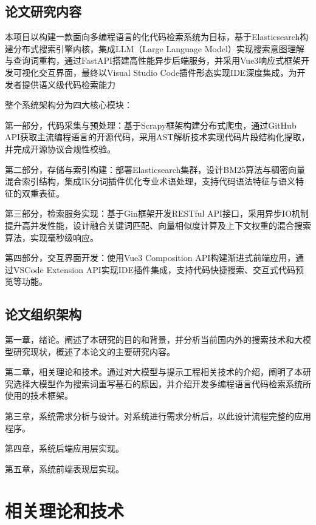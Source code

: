 \documentclass[UTF8,a4paper,12pt]{ctexart}
\numberwithin{equation}{section}
\begin{document}
\subsection{论文研究内容}
本项目以构建一款面向多编程语言的化代码检索系统为目标，基于Elasticsearch构建分布式搜索引擎内核，集成LLM（Large Language Model）实现搜索意图理解与查询词重构，通过FastAPI搭建高性能异步后端服务，并采用Vue3响应式框架开发可视化交互界面，最终以Visual Studio Code插件形态实现IDE深度集成，为开发者提供语义级代码检索能力\par
整个系统架构分为四大核心模块：\par
第一部分，​代码采集与预处理：基于Scrapy框架构建分布式爬虫，通过GitHub API获取主流编程语言的开源代码，采用AST解析技术实现代码片段结构化提取，并完成开源协议合规性校验。\par
第二部分，​存储与索引构建：部署Elasticsearch集群，设计BM25算法与稠密向量混合索引结构，集成IK分词插件优化专业术语处理，支持代码语法特征与语义特征的双重表征。\par
第三部分，​检索服务实现：基于Gin框架开发RESTful API接口，采用异步IO机制提升高并发性能，设计融合关键词匹配、向量相似度计算及上下文权重的混合搜索算法，实现毫秒级响应。\par
第四部分，​交互界面开发：使用Vue3 Composition API构建渐进式前端应用，通过VSCode Extension API实现IDE插件集成，支持代码快捷搜索、交互式代码预览等功能。\par

\subsection{论文组织架构}
第一章，绪论。阐述了本研究的目的和背景，并分析当前国内外的搜索技术和大模型研究现状，概述了本论文的主要研究内容。\par
第二章，相关理论和技术。通过对大模型与提示工程相关技术的介绍，阐明了本研究选择大模型作为搜索词重写基石的原因，并介绍开发多编程语言代码检索系统所使用的技术框架。\par
第三章，系统需求分析与设计。对系统进行需求分析后，以此设计流程完整的应用程序。\par
第四章，系统后端应用层实现。\par
第五章，系统前端表现层实现。\par


\newpage
{}

\section{相关理论和技术}
\end{document}
